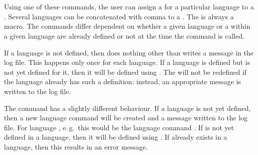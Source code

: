 \begin{Declaration}
    \\
    \\
    \\
    \\
    \\
    \\
    \\
\end{Declaration}
%
%
%
%
Using one of these commands, the user can assign a  for a
particular language to a . Several languages can be concatenated
with comma to a .  The  is always a
macro. The commands differ dependent on whether a given language or a
 within a given language are already defined or not at the
time the command is called.

If a language is not defined, then  does
nothing other than writes a message in the log file. This happens only once
for each language.  If a language is defined but  is not yet
defined for it, then it will be defined using .  The
 will not be redefined if the language already has such a
definition; instead, an appropriate message is written to the log file.

The command  has a slightly different behaviour.  If a
language is not yet defined, then a new language command will be
created and a message written to the log file. For language
, e.\,g.\, this would be the language command
. If  is not yet defined in a
language, then it will be defined using .  If
 already exists in a language, then this results in an error
message.

